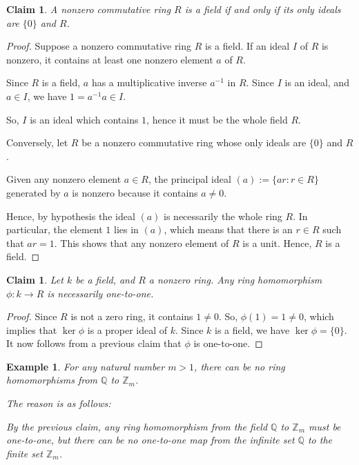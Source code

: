 \documentclass[a4paper,12pt]{report}
\newcounter{statement}
\numberwithin{statement}{chapter}
\newtheorem{claim}[statement]{Claim}
\newtheorem{eg}[statement]{\bf Example}
\numberwithin{equation}{chapter}
\numberwithin{section}{chapter}
\numberwithin{subsection}{section}
\begin{document}
\begin{claim}
A nonzero commutative ring $R$ is a field if and only if its only ideals are
$\{0\}$ and $R$.
\end{claim}
\begin{proof}

Suppose a nonzero commutative ring $R$ is a field.
If an ideal $I$ of $R$ is nonzero, it contains at least one
nonzero element $a$ of $R$.


Since $R$ is a field, $a$ has a multiplicative inverse $a^{-1}$ in $R$.
Since $I$ is an ideal, and $a \in I$, we have $1 = a^{-1} a \in I$.


So, $I$ is an ideal which contains $1$,
hence it must be the whole field $R$.





Conversely, let $R$ be a nonzero commutative ring whose only ideals are $\{0\}$ and $R$.


Given any nonzero element $a \in R$,
the principal ideal $(a) := \{ar : r \in R\}$ generated by $a$ is nonzero because it contains $a \neq 0$.


Hence, by hypothesis the ideal $(a)$ is necessarily the whole ring $R$.
In particular, the element $1$ lies in $(a)$, which means that there is an $r \in R$
such that $ar = 1$.
This shows that any nonzero element of $R$ is a unit.  Hence, $R$ is a field.


\end{proof}

\begin{claim}
Let $k$ be a field, and $R$ a nonzero ring.  Any ring homomorphism $\phi : k \rightarrow R$ is necessarily one-to-one.
\end{claim}
\begin{proof}

Since $R$ is not a zero ring, it contains $1 \neq 0$.  So, $\phi(1) = 1 \neq 0$, which implies that $\ker \phi$
is a proper ideal of $k$.  Since $k$ is a field, we have $\ker \phi = \{0\}$.  It now follows from a previous claim that $\phi$ is one-to-one.


\end{proof}



\begin{eg}

For any natural number $m  > 1$,
there can be no ring homomorphisms from $\mathbb{Q}$ to $\mathbb{Z}_m$.



The reason is as follows:




By the previous claim, any ring homomorphism from the field $\mathbb{Q}$
to $\mathbb{Z}_m$ must be one-to-one, but there can be no one-to-one
map from the infinite set $\mathbb{Q}$ to the finite set $\mathbb{Z}_m$.

\end{eg}
\end{document}
